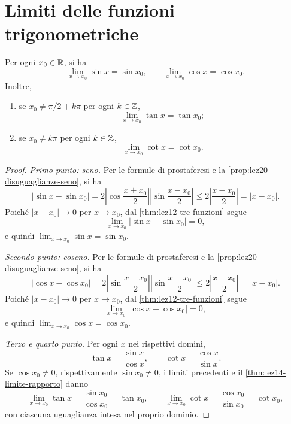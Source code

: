 \section{Limiti delle funzioni trigonometriche}
\label{sec:lez20-limiti-trigonometrici}

\begin{proposition}
\label{prop:lez20-limiti-trigonometrici}
Per ogni \(x_0\in\mathbb{R}\), si ha
\[
  \lim_{x\to x_0}\sin x=\sin x_0,
  \qquad
  \lim_{x\to x_0}\cos x=\cos x_0.
\]
Inoltre,
\begin{enumerate}
  \item se \(x_0\ne\pi/2+k\pi\) per ogni \(k\in\mathbb{Z}\),
  \[
    \lim_{x\to x_0}\tan x=\tan x_0;
  \]
  \item se \(x_0\ne k\pi\) per ogni \(k\in\mathbb{Z}\),
  \[
    \lim_{x\to x_0}\cot x=\cot x_0.
  \]
\end{enumerate}
\end{proposition}

\begin{proof}
\emph{Primo punto: seno.}
Per le formule di prostaferesi e la
\cref{prop:lez20-disuguaglianze-seno}, si ha
\[
  |\sin x-\sin x_0|
  =2\left|\cos\frac{x+x_0}{2}\right|
    \left|\sin\frac{x-x_0}{2}\right|
  \le2\left|\frac{x-x_0}{2}\right|
  =|x-x_0|.
\]
Poiché \(|x-x_0|\to0\) per \(x\to x_0\), dal
\cref{thm:lez12-tre-funzioni} segue
\[
  \lim_{x\to x_0}|\sin x-\sin x_0|=0,
\]
e quindi \(\lim_{x\to x_0}\sin x=\sin x_0\).

\emph{Secondo punto: coseno.}
Per le formule di prostaferesi e la
\cref{prop:lez20-disuguaglianze-seno}, si ha
\[
  |\cos x-\cos x_0|
  =2\left|\sin\frac{x+x_0}{2}\right|
    \left|\sin\frac{x-x_0}{2}\right|
  \le2\left|\frac{x-x_0}{2}\right|
  =|x-x_0|.
\]
Poiché \(|x-x_0|\to0\) per \(x\to x_0\), dal
\cref{thm:lez12-tre-funzioni} segue
\[
  \lim_{x\to x_0}|\cos x-\cos x_0|=0,
\]
e quindi \(\lim_{x\to x_0}\cos x=\cos x_0\).

\emph{Terzo e quarto punto.}
Per ogni \(x\) nei rispettivi domini,
\[
  \tan x=\frac{\sin x}{\cos x},
  \qquad
  \cot x=\frac{\cos x}{\sin x}.
\]
Se \(\cos x_0\ne0\), rispettivamente
\(\sin x_0\ne0\), i limiti precedenti
e il \cref{thm:lez14-limite-rapporto} danno
\[
  \lim_{x\to x_0}\tan x
    =\frac{\sin x_0}{\cos x_0}=\tan x_0,
  \qquad
  \lim_{x\to x_0}\cot x
    =\frac{\cos x_0}{\sin x_0}=\cot x_0,
\]
con ciascuna uguaglianza intesa nel proprio dominio.
\end{proof}

\clearpage

